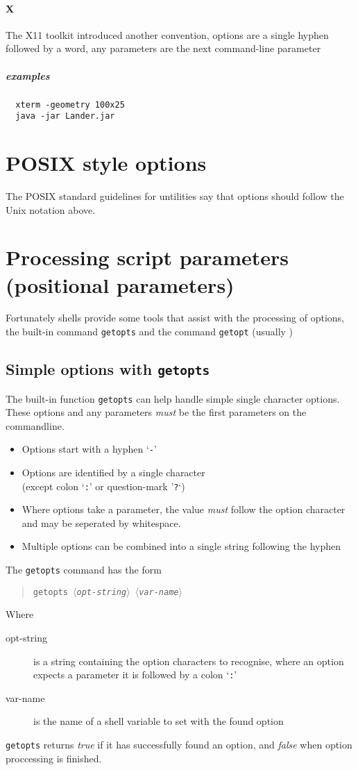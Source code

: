 \documentclass[12pt,a4paper]{article}
\newcommand{\required}[1]{$\langle$\itshape #1$\rangle$}
\begin{document}
\paragraph{X} The X11 toolkit introduced another convention, options are a single hyphen followed by a word, any parameters are the next command-line parameter
\subparagraph{examples}
\begin{verbatim}
  xterm -geometry 100x25
  java -jar Lander.jar
\end{verbatim}

\section{POSIX style options}
The POSIX standard guidelines for untilities say that options should follow the Unix notation above.
\section{Processing script parameters (positional parameters)}
Fortunately shells provide some tools that assist with the processing of options, the built-in command \verb'getopts' and the command \verb'getopt'  (usually )

\subsection{Simple options with \texttt{getopts}}
The built-in function \texttt{getopts} can help handle simple single character options.  These options and any parameters \emph{must} be the first parameters on the commandline.

\begin{itemize}
  \item Options start with a hyphen `\texttt{-}'
  \item Options are identified by a single character \\
        (except colon `\texttt{:}' or question-mark '\texttt{?}`)
  \item Where options take a parameter, the value \emph{must} follow the option character and may be seperated by whitespace.
  \item Multiple options can be combined into a single string following the hyphen
\end{itemize}

The \texttt{getopts} command has the form
\begin{quote}
\texttt{getopts \required{opt-string} \required{var-name}}
\end{quote}
Where
\begin{description}
  \item[opt-string] is a string containing the option characters to recognise, where an option expects a parameter it is followed by a colon `\texttt{:}'
  \item[var-name] is the name of a shell variable to set with the found option
\end{description}
\texttt{getopts} returns \textit{true} if it has successfully found an option, and \textit{false} when option proccessing is finished.
\end{document}
